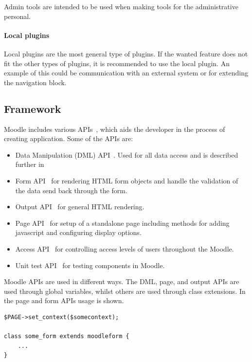 Admin tools are intended to be used when making tools for the administrative personal.

\paragraph{Local plugins}
Local plugins are the most general type of plugins. If the wanted feature does not fit the other types of plugins, it is recommended to use the local plugin. An example of this could be communication with an external system or for extending the navigation block. 




\subsection{Framework}
Moodle includes various APIs~\cite{moodlecoreapis}, which aids the developer in the process of creating application. Some of the APIs are:

\begin{itemize}
	\item Data Manipulation (DML) API~\cite{moodledml}. Used for all data access and is described further in 
	\item Form API~\cite{moodleformapi} for rendering HTML form objects and handle the validation of the data send back through the form. 
	\item Output API~\cite{moodleoutputapi} for general HTML rendering.
	\item Page API~\cite{moodlepageapi} for setup of a standalone page including methods for adding javascript and configuring display options. 
	\item Access API~\cite{moodleaccessapi} for controlling access levels of users throughout the Moodle. 
	\item Unit test API~\cite{moodleunittestapi} for testing components in Moodle. 
\end{itemize}
Moodle APIs are used in different ways. The DML, page, and output APIs are used through global variables, whilst others are used through class extensions. In~ the page and form APIs usage is shown.
\begin{lstlisting}[style=phpCode, caption=\myCaption{Example of the Page and form APIs in Moodle}, label=moodleapiusage]
$PAGE->set_context($somecontext);

class some_form extends moodleform {
	...
}
\end{lstlisting}


